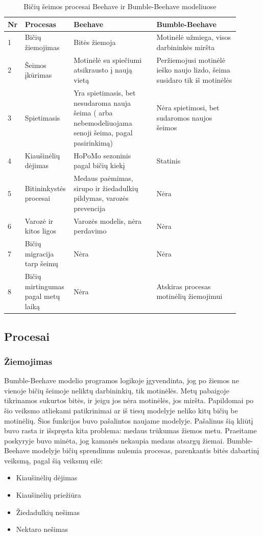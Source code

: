\documentclass{VUMIFPSmagistrinis}
\begin{document}
\begin{table}[H]\footnotesize
  \centering
  \caption{Bičių šeimos procesai Beehave ir Bumble-Beehave modeliuose}
  \label{tab:proc}
  \begin{tabular}{p{0.05\linewidth}p{0.15\linewidth}p{0.35\linewidth}p{0.35\linewidth}} \hline
    Nr & Procesas & Beehave & Bumble-Beehave \\
    \hline
    1 &	Bičių žiemojimas &	Bitės žiemoja &	Motinėlė užmiega, visos darbininkės miršta \\
    \hline
2 &	Šeimos įkūrimas	& Motinėlė su spiečiumi atsikrausto į naują vietą &	Peržiemojusi motinėlė ieško naujo lizdo, šeima susidaro tik iš motinėlės \\
\hline
3 &	Spietimasis &	Yra spietimasis, bet nesudaroma nauja šeima ( arba nebemodeliuojama senoji šeima, pagal pasirinkimą) &	Nėra spietimosi, bet sudaromos naujos šeimos \\
\hline
4 &	Kiaušinėlių dėjimas &	HoPoMo \cite{ScC07} sezoninis pagal bičių kiekį &	Statinis \\
\hline
5 &	Bitininkystės procesai &	Medaus paėmimas, sirupo ir žiedadulkių pildymas, varozės prevencija &	Nėra \\
\hline
6 &	Varozė ir kitos ligos &	Varozės modelis, nėra perdavimo &	Nėra \\
\hline
7 &	Bičių migracija tarp šeimų &	Nėra &	Nėra \\
\hline
8 &	Bičių mirtingumas pagal metų laiką & 	Nėra &	Atskiras procesas motinėlių žiemojimui \\
    \hline
  \end{tabular}

\end{table}









\subsection{Procesai}
\subsubsection{Žiemojimas}
Bumble-Beehave modelio programos logikoje įgyvendinta, jog po žiemos ne vienoje bičių šeimoje neliktų darbininkių, tik motinėlės. Metų pabaigoje tikrinamos sukurtos bitės, ir jeigu jos nėra motinėlės, jos miršta. Papildomai po šio veiksmo atliekami patikrinimai ar iš tiesų modelyje neliko kitų bičių be motinėlių. Šios funkcijos buvo pašalintos naujame modelyje.
Pašalinus šią kliūtį buvo rasta ir išspręsta kita problema: medaus trūkumas žiemos metu. Praeitame poskyryje buvo minėta, jog kamanės nekaupia medaus atsargų žiemai. Bumble-Beehave modelyje bičių sprendimus nulemia procesas, parenkantis bitės dabartinį veiksmą, pagal šią veiksmų eilė:
\begin{itemize}
\item Kiaušinėlių dėjimas
\item Kiaušinėlių priežiūra
\item Žiedadulkių nešimas
\item Nektaro nešimas
\end{itemize}{}
\end{document}
